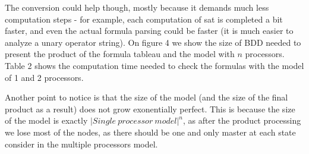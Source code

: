 \documentclass[11pt]{article}
\begin{document}
        The conversion could help though, mostly because it demands much less computation steps - for example, each computation of sat is completed a bit faster,
        and even the actual formula parsing could be faster (it is much easier to analyze a unary operator string). On figure 4 we show the size of BDD needed to
        present the product of the formula tableau and the model with $n$ processors. Table 2 shows the computation time needed to check the formulas with
        the model of 1 and 2 processors.

        Another point to notice is that the size of the model (and the size of the final product as a result) does not grow exonentially perfect. This is because
        the size of the model is exactly $|Single\ processor\ model|^n$, as after the product processing we lose most of the nodes, as there should be one and
        only master at each state consider in the multiple processors model.
\end{document}
